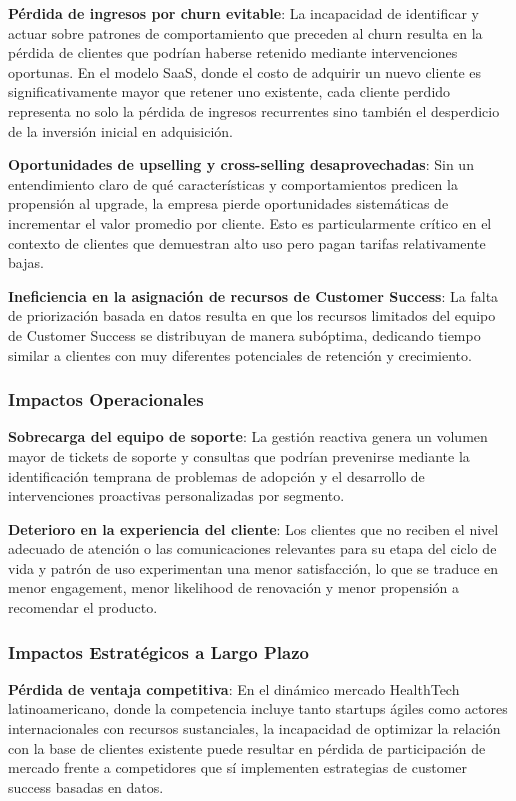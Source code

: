 \textbf{Pérdida de ingresos por churn evitable}: La incapacidad de identificar y actuar sobre patrones de comportamiento que preceden al churn resulta en la pérdida de clientes que podrían haberse retenido mediante intervenciones oportunas. En el modelo SaaS, donde el costo de adquirir un nuevo cliente es significativamente mayor que retener uno existente, cada cliente perdido representa no solo la pérdida de ingresos recurrentes sino también el desperdicio de la inversión inicial en adquisición.

\textbf{Oportunidades de upselling y cross-selling desaprovechadas}: Sin un entendimiento claro de qué características y comportamientos predicen la propensión al upgrade, la empresa pierde oportunidades sistemáticas de incrementar el valor promedio por cliente. Esto es particularmente crítico en el contexto de clientes que demuestran alto uso pero pagan tarifas relativamente bajas.

\textbf{Ineficiencia en la asignación de recursos de Customer Success}: La falta de priorización basada en datos resulta en que los recursos limitados del equipo de Customer Success se distribuyan de manera subóptima, dedicando tiempo similar a clientes con muy diferentes potenciales de retención y crecimiento.

\subsubsection{Impactos Operacionales}

\textbf{Sobrecarga del equipo de soporte}: La gestión reactiva genera un volumen mayor de tickets de soporte y consultas que podrían prevenirse mediante la identificación temprana de problemas de adopción y el desarrollo de intervenciones proactivas personalizadas por segmento.

\textbf{Deterioro en la experiencia del cliente}: Los clientes que no reciben el nivel adecuado de atención o las comunicaciones relevantes para su etapa del ciclo de vida y patrón de uso experimentan una menor satisfacción, lo que se traduce en menor engagement, menor likelihood de renovación y menor propensión a recomendar el producto.

\subsubsection{Impactos Estratégicos a Largo Plazo}

\textbf{Pérdida de ventaja competitiva}: En el dinámico mercado HealthTech latinoamericano, donde la competencia incluye tanto startups ágiles como actores internacionales con recursos sustanciales, la incapacidad de optimizar la relación con la base de clientes existente puede resultar en pérdida de participación de mercado frente a competidores que sí implementen estrategias de customer success basadas en datos.


